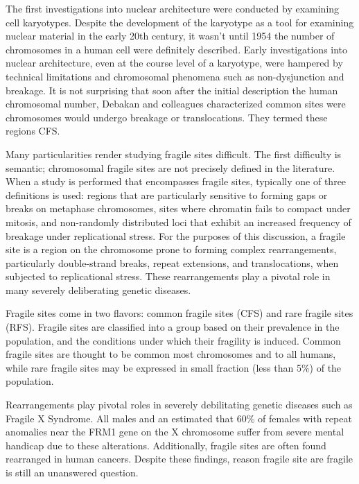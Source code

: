 The first investigations into nuclear architecture were conducted by examining cell karyotypes.  Despite the development of the karyotype as a
tool for examining nuclear material in the early 20th century\cite{levitsky1924}, it wasn't until 1954 the number of chromosomes in a human
cell were definitely described\cite{tjio1956}.  Early investigations into nuclear architecture, even at the course level of a karyotype, were
hampered by technical limitations and chromosomal phenomena such as non-dysjunction and breakage.  It is not surprising that soon after the
initial description the human chromosomal number, Debakan and colleagues characterized common sites were chromosomes would undergo breakage or
translocations.  They termed these regions \gls{CFS}\cite{leyden2008}.

Many particularities render studying fragile sites difficult.  The first difficulty is semantic; chromosomal fragile sites are not precisely
defined in the literature.  When a study is performed that encompasses fragile sites, typically one of three definitions is used: regions
that are particularly sensitive to forming gaps or breaks on metaphase chromosomes\cite{glover2005}, sites where chromatin fails to compact
under mitosis\cite{leyden2008}, and non-randomly distributed loci that exhibit an increased frequency of breakage under replicational
stress\cite{franchitto2013}.  For the purposes of this discussion, a \gls{fragile site} is a region on the chromosome prone to
forming complex rearrangements, particularly double-strand breaks, repeat extensions, and translocations, when subjected to replicational stress.
These rearrangements play a pivotal role in many severely deliberating genetic diseases.

Fragile sites come in two flavors: common fragile sites (CFS) and rare fragile sites (RFS).  Fragile sites are classified into a group based on their
prevalence in the population, and the conditions under which their fragility is induced\cite{leyden2008}.  Common fragile sites are thought to be common
most chromosomes and to all humans, while rare fragile sites may be expressed in small fraction (less than 5\%) of the population\cite{wells2006}.

Rearrangements play pivotal roles in severely debilitating genetic diseases such as Fragile X Syndrome.  All males and an estimated that 60\% of females
with repeat anomalies near the FRM1 gene on the X chromosome suffer from severe mental handicap due to these alterations\cite{sutherland1995}. Additionally,
fragile sites are often found rearranged in human cancers\cite{glover2005}.  Despite these findings, reason fragile site are fragile is still an
unanswered question.
